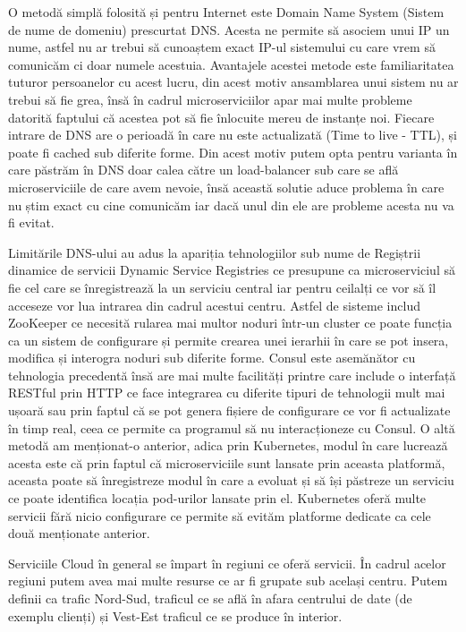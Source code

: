 O metodă simplă folosită și pentru Internet este Domain Name System (Sistem de nume de domeniu)
prescurtat DNS. Acesta ne permite să asociem unui IP un nume, astfel nu ar trebui să cunoaștem exact
IP-ul sistemului cu care vrem să comunicăm ci doar numele acestuia. Avantajele acestei metode este
familiaritatea tuturor persoanelor cu acest lucru, din acest motiv ansamblarea unui sistem nu ar 
trebui să fie grea, însă în cadrul microserviciilor apar mai multe probleme datorită faptului că
acestea pot să fie înlocuite mereu de instanțe noi. Fiecare intrare de DNS are o perioadă în care
nu este actualizată (Time to live - TTL), și poate fi cached sub diferite forme. Din acest motiv 
putem opta pentru varianta în care păstrăm în DNS doar calea către un load-balancer sub care 
se află microserviciile de care avem nevoie, însă această solutie aduce problema în care nu știm 
exact cu cine comunicăm iar dacă unul din ele are probleme acesta nu va fi evitat.

Limitările DNS-ului au adus la apariția tehnologiilor sub nume de Regiștrii dinamice de servicii
Dynamic Service Registries ce presupune ca microserviciul să fie cel care se înregistrează
la un serviciu central iar pentru ceilalți ce vor să îl acceseze vor lua intrarea din cadrul
acestui centru. Astfel de sisteme includ ZooKeeper ce necesită rularea mai multor noduri 
într-un cluster ce poate funcția ca un sistem de configurare și permite crearea unei ierarhii
în care se pot insera, modifica și interogra noduri sub diferite forme. Consul este asemănător 
cu tehnologia precedentă însă are mai multe facilități printre care include o interfață
RESTful prin HTTP ce face integrarea cu diferite tipuri de tehnologii mult mai ușoară 
sau prin faptul că se pot genera fișiere de configurare ce vor fi actualizate în timp real, ceea
ce permite ca programul să nu interacționeze cu Consul. O altă metodă am menționat-o anterior,
adica prin Kubernetes, modul în care lucrează acesta este că prin faptul că microserviciile 
sunt lansate prin aceasta platformă, aceasta poate să înregistreze modul în care a evoluat
și să își păstreze un serviciu ce poate identifica locația pod-urilor lansate prin el.
Kubernetes oferă multe servicii fără nicio configurare ce permite să evităm platforme dedicate
ca cele două menționate anterior.

Serviciile Cloud în general se împart în regiuni ce oferă servicii. În cadrul acelor regiuni
putem avea mai multe resurse ce ar fi grupate sub același centru. Putem definii ca trafic
Nord-Sud, traficul ce se află în afara centrului de date (de exemplu clienți) și 
Vest-Est traficul ce se produce în interior.

